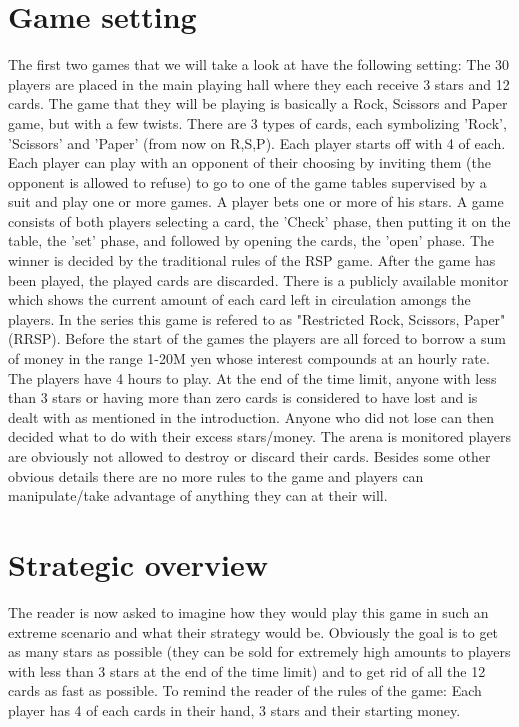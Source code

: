 \documentclass[11pt]{article}
\begin{document}
\section{Game setting}
The first two games that we will take a look at have the following setting: 
The 30 players are placed in the main playing hall where they each receive 3 stars and 12 cards. 
The game that they will be playing is basically a Rock, Scissors and Paper game, but with a few twists.
There are 3 types of cards, each symbolizing 'Rock', 'Scissors' and 'Paper' (from now on R,S,P). Each player starts off with 4 of each. Each player can play with an opponent of their choosing by inviting them (the opponent is allowed to refuse) to go to one of the game tables supervised by a suit and play one or more games. A player bets one or more of his stars. A game consists of both players selecting a card, the 'Check' phase, then putting it on the table, the 'set' phase, and followed by opening the cards, the 'open' phase. The winner is decided by the traditional rules of the RSP game. After the game has been played, the played cards are discarded. There is a publicly available monitor which shows the current amount of each card left in circulation amongs the players. 
In the series this game is refered to as "Restricted Rock, Scissors, Paper" (RRSP).
Before the start of the games the players are all forced to borrow a sum of money in the range 1-20M yen whose interest compounds at an hourly rate.
The players have 4 hours to play. At the end of the time limit, anyone with less than 3 stars or having more than zero cards is considered to have lost and is dealt with as mentioned in the introduction. Anyone who did not lose can then decided what to do with their excess stars/money. The arena is monitored players are obviously not allowed to destroy or discard their cards. Besides some other obvious details there are no more rules to the game and players can manipulate/take advantage of anything they can at their will. \\

\section{Strategic overview}
The reader is now asked to imagine how they would play this game in such an extreme scenario and what their strategy would be. Obviously the goal is to get as many stars as possible (they can be sold for extremely high amounts to players with less than 3 stars at the end of the time limit) and to get rid of all the 12 cards as fast as possible. To remind the reader of the rules of the game:  Each player has 4 of each cards in their hand, 3 stars and their starting money. 
\end{document}

